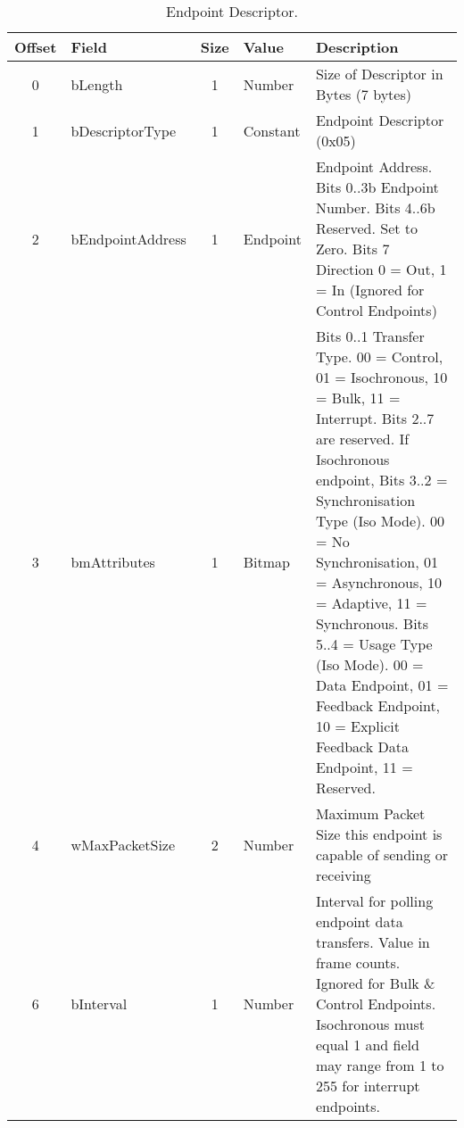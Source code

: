 \begin{appendices}
\begin{table}[h]
\centering
\label{tab:usb_endpoint_descriptor}
\begin{tabular}{|c|l|c|l|p{8cm}|}
\hline
\textbf{Offset} & \textbf{Field} & \textbf{Size} & \textbf{Value} & \textbf{Description} \\ \hline
0 & bLength & 1 & Number & Size of Descriptor in Bytes (7 bytes) \\ \hline
1 & bDescriptorType & 1 & Constant & Endpoint Descriptor (0x05) \\ \hline
2 & bEndpointAddress & 1 & Endpoint & Endpoint Address. Bits 0..3b Endpoint Number. Bits 4..6b Reserved. Set to Zero. Bits 7 Direction 0 = Out, 1 = In (Ignored for Control Endpoints) \\ \hline
3 & bmAttributes & 1 & Bitmap & Bits 0..1 Transfer Type. 00 = Control, 01 = Isochronous, 10 = Bulk, 11 = Interrupt. Bits 2..7 are reserved. If Isochronous endpoint, Bits 3..2 = Synchronisation Type (Iso Mode). 00 = No Synchronisation, 01 = Asynchronous, 10 = Adaptive, 11 = Synchronous. Bits 5..4 = Usage Type (Iso Mode). 00 = Data Endpoint, 01 = Feedback Endpoint, 10 = Explicit Feedback Data Endpoint, 11 = Reserved. \\ \hline
4 & wMaxPacketSize & 2 & Number & Maximum Packet Size this endpoint is capable of sending or receiving \\ \hline
6 & bInterval & 1 & Number & Interval for polling endpoint data transfers. Value in frame counts. Ignored for Bulk \& Control Endpoints. Isochronous must equal 1 and field may range from 1 to 255 for interrupt endpoints. \\ \hline
\end{tabular}
\caption{Endpoint Descriptor.}
\end{table}



\end{appendices}
